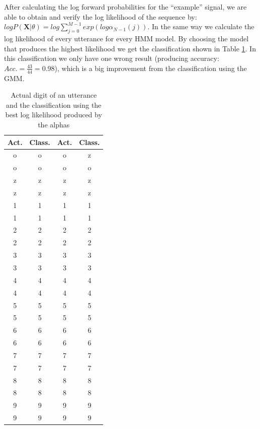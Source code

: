 \documentclass[12pt,a4paper,oneside]{article}
\begin{document}
After calculating the log forward probabilities for the ``example'' signal, we are able to obtain and verify the log likelihood of the sequence by: $logP(\mathbf{X} | \theta) = log\sum_{j = 0}^{M - 1} exp(log\alpha_{N - 1}(j))$. In the same way we calculate the log likelihood of every utterance for every HMM model. By choosing the model that produces the highest likelihood we get the classification shown in Table \ref{tab:HMM_class}. In this classification we only have one wrong result (producing accuracy: $Acc. = \frac{43}{44} = 0.98$), which is a big improvement from the classification using the GMM.

\begin{table}[!ht]
\begin{center}
\footnotesize
\caption{Actual digit of an utterance and the classification using the best log likelihood produced by the alphas} \label{tab:HMM_class}
    \begin{tabular}{||c|c||c|c||}
    \hline
    Act. & Class. & Act. & Class. \\
    \hline
    o & o & o & z \\
    o & o & o & o \\
    z & z & z & z \\
    z & z & z & z \\
    1 & 1 & 1 & 1 \\
    1 & 1 & 1 & 1 \\
    2 & 2 & 2 & 2 \\
    2 & 2 & 2 & 2 \\
    3 & 3 & 3 & 3 \\
    3 & 3 & 3 & 3 \\
    4 & 4 & 4 & 4 \\
    4 & 4 & 4 & 4 \\
    5 & 5 & 5 & 5 \\
    5 & 5 & 5 & 5 \\
    6 & 6 & 6 & 6 \\
    6 & 6 & 6 & 6 \\
    7 & 7 & 7 & 7 \\
    7 & 7 & 7 & 7 \\
    8 & 8 & 8 & 8 \\
    8 & 8 & 8 & 8 \\
    9 & 9 & 9 & 9 \\
    9 & 9 & 9 & 9 \\
    \hline
    \end{tabular}
    \end{center}
\end{table}
\end{document}
